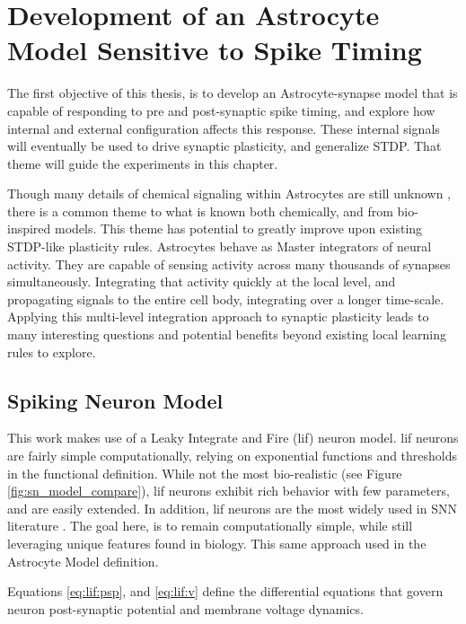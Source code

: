 %

\chapter{Development of an Astrocyte Model Sensitive to Spike Timing} \label{chapter:obj1}
The first objective of this thesis, is to develop an Astrocyte-synapse model
that is capable of responding to pre and post-synaptic spike timing, and
explore how internal and external configuration affects this response. These
internal signals will eventually be used to drive synaptic plasticity, and
generalize STDP. That theme will guide the experiments in this chapter.

Though many details of chemical signaling within Astrocytes are still unknown
\parencite{manninen_2018}, there is a common theme to what is known both chemically,
and from bio-inspired models. This theme has potential to greatly improve upon
existing STDP-like plasticity rules. Astrocytes behave as Master integrators of
neural activity. They are capable of sensing activity across many thousands of
synapses simultaneously. Integrating that activity quickly at the local level,
and propagating signals to the entire cell body, integrating over a longer
time-scale. Applying this multi-level integration approach to synaptic
plasticity leads to many interesting questions and potential benefits beyond
existing local learning rules to explore.

\section{Spiking Neuron Model}
This work makes use of a Leaky Integrate and Fire (\Gls{lif}) neuron model. \Gls{lif}
neurons are fairly simple computationally, relying on exponential functions
and thresholds in the functional definition. While not the most
bio-realistic (see Figure \ref{fig:sn_model_compare}), \Gls{lif} neurons exhibit
rich behavior with few parameters, and are easily extended. In addition, \Gls{lif}
neurons are the most widely used in SNN literature \cite{ponulak_2011}. The
goal here, is to remain computationally simple, while still leveraging unique
features found in biology. This same approach used in the Astrocyte Model
definition.

Equations \ref{eq:lif:psp}, and \ref{eq:lif:v} define the differential equations
that govern neuron post-synaptic potential and membrane voltage dynamics.

